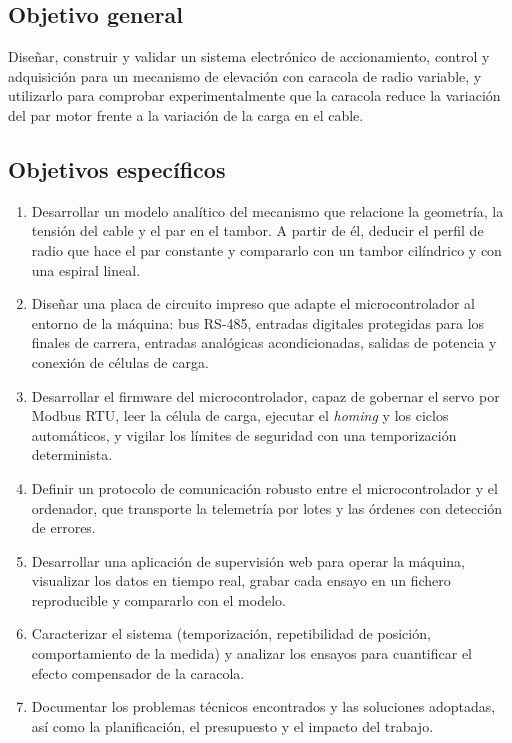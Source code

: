 \subsection{Objetivo general}

Diseñar, construir y validar un sistema electrónico de accionamiento, control y adquisición para
un mecanismo de elevación con caracola de radio variable, y utilizarlo para comprobar
experimentalmente que la caracola reduce la variación del par motor frente a la variación de la
carga en el cable.

\subsection{Objetivos específicos}

\begin{enumerate}[label=\textbf{O\arabic*.}]
  \item Desarrollar un modelo analítico del mecanismo que relacione la geometría, la tensión del
        cable y el par en el tambor. A partir de él, deducir el perfil de radio que hace el par
        constante y compararlo con un tambor cilíndrico y con una espiral lineal.
  \item Diseñar una placa de circuito impreso que adapte el microcontrolador al entorno de la
        máquina: bus RS-485, entradas digitales protegidas para los finales de carrera, entradas
        analógicas acondicionadas, salidas de potencia y conexión de células de carga.
  \item Desarrollar el firmware del microcontrolador, capaz de gobernar el servo por Modbus RTU,
        leer la célula de carga, ejecutar el \emph{homing} y los ciclos automáticos, y vigilar los
        límites de seguridad con una temporización determinista.
  \item Definir un protocolo de comunicación robusto entre el microcontrolador y el ordenador,
        que transporte la telemetría por lotes y las órdenes con detección de errores.
  \item Desarrollar una aplicación de supervisión web para operar la máquina, visualizar los datos
        en tiempo real, grabar cada ensayo en un fichero reproducible y compararlo con el modelo.
  \item Caracterizar el sistema (temporización, repetibilidad de posición, comportamiento de la
        medida) y analizar los ensayos para cuantificar el efecto compensador de la caracola.
  \item Documentar los problemas técnicos encontrados y las soluciones adoptadas, así como la
        planificación, el presupuesto y el impacto del trabajo.
\end{enumerate}

